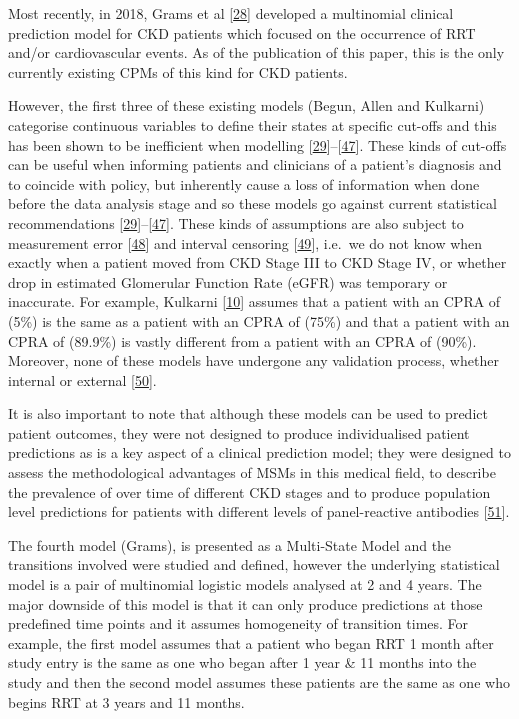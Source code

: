 \documentclass[
]{article}
\begin{document}
Most recently, in 2018, Grams et al {[}\protect\hyperlink{ref-grams_predicting_2018}{28}{]} developed a multinomial clinical prediction model for CKD patients which focused on the occurrence of RRT and/or cardiovascular events. As of the publication of this paper, this is the only currently existing CPMs of this kind for CKD patients.

However, the first three of these existing models (Begun, Allen and Kulkarni) categorise continuous variables to define their states at specific cut-offs and this has been shown to be inefficient when modelling {[}\protect\hyperlink{ref-altman_problems_1994-1}{29}{]}--{[}\protect\hyperlink{ref-weinberg_how_1995}{47}{]}. These kinds of cut-offs can be useful when informing patients and clinicians of a patient's diagnosis and to coincide with policy, but inherently cause a loss of information when done before the data analysis stage and so these models go against current statistical recommendations {[}\protect\hyperlink{ref-altman_problems_1994-1}{29}{]}--{[}\protect\hyperlink{ref-weinberg_how_1995}{47}{]}. These kinds of assumptions are also subject to measurement error {[}\protect\hyperlink{ref-van_smeden_reflection_2019}{48}{]} and interval censoring {[}\protect\hyperlink{ref-sun_interval_2005}{49}{]}, i.e.~we do not know when exactly when a patient moved from CKD Stage III to CKD Stage IV, or whether drop in estimated Glomerular Function Rate (eGFR) was temporary or inaccurate. For example, Kulkarni {[}\protect\hyperlink{ref-kulkarni_transition_2017}{10}{]} assumes that a patient with an CPRA of (5\%) is the same as a patient with an CPRA of (75\%) and that a patient with an CPRA of (89.9\%) is vastly different from a patient with an CPRA of (90\%). Moreover, none of these models have undergone any validation process, whether internal or external {[}\protect\hyperlink{ref-altman_prognosis_2009}{50}{]}.

It is also important to note that although these models can be used to predict patient outcomes, they were not designed to produce individualised patient predictions as is a key aspect of a clinical prediction model; they were designed to assess the methodological advantages of MSMs in this medical field, to describe the prevalence of over time of different CKD stages and to produce population level predictions for patients with different levels of panel-reactive antibodies {[}\protect\hyperlink{ref-royston_prognosis_2009}{51}{]}.

The fourth model (Grams), is presented as a Multi-State Model and the transitions involved were studied and defined, however the underlying statistical model is a pair of multinomial logistic models analysed at 2 and 4 years. The major downside of this model is that it can only produce predictions at those predefined time points and it assumes homogeneity of transition times. For example, the first model assumes that a patient who began RRT 1 month after study entry is the same as one who began after 1 year \& 11 months into the study and then the second model assumes these patients are the same as one who begins RRT at 3 years and 11 months.
\end{document}
